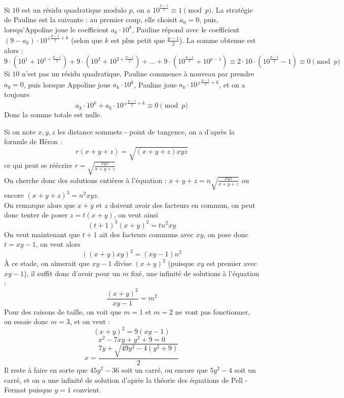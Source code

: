 \begin{sol}
Si $10$ est un résidu quadratique modulo $p$, on a $10^{\frac{p - 1}2}\equiv 1 \pmod p$. La stratégie de Pauline est la suivante : au premier coup, elle choisit $a_0 = 0$, puis, lorsqu'Appoline joue le coefficient $a_k\cdot 10^k$, Pauline répond avec le coefficient $(9 - a_k)\cdot 10^{\pm \frac{p - 1}2 + k}$ (selon que $k$ est plus petit que $\frac{p - 1}2$). La somme obtenue est alors :
$$9\cdot (10^1 + 10^{1 + \frac{p - 1}2}) + 9\cdot (10^2 + 10^{2 + \frac{p - 1}2}) + \dots  + 9\cdot (10^{\frac{p - 1}2} + 10^{p - 1})\equiv 2\cdot 10\cdot (10^{\frac{p - 1}2} - 1)\equiv 0\pmod p$$
Si $10$ n'est pas un résidu quadratique, Pauline commence à nouveau par prendre $a_0 = 0$, puis lorsque Appoline joue $a_k\cdot 10^k$, Pauline joue $a_k\cdot 10^{\pm \frac{p - 1}2 + k}$, et on a toujours 
$$a_k\cdot 10^k + a_k\cdot 10^{\pm \frac{p - 1}2 + k}\equiv 0 \pmod p$$
Donc la somme totale est nulle.
\end{sol}


\begin{sol}
Si on note $x, y, z$ les distance sommets - point de tangence, on a d'après la formule de Héron :
$$r(x + y + z) = \sqrt{(x + y + z)xyz}$$
ce qui peut se réécrire $r = \sqrt{\frac{xyz}{x + y + z}}$\\
On cherche donc des solutions entières à l'équation : $x + y + z = n\sqrt{\frac{xyz}{x + y + z}}$ ou encore $(x + y + z)^3 = n^2 xyz$. \\
On remarque alors que $x + y$ et $z$ doivent avoir des facteurs en commun, on peut donc tenter de poser $z = t(x + y)$, on veut ainsi
$$(t + 1)^3(x + y)^2 = tn^2xy$$
On veut maintenant que $t + 1$ ait des facteurs communs avec $xy$, on pose donc $t = xy - 1$, on veut alors $$((x + y)xy)^2 = (xy - 1)n^2$$
À ce stade, on aimerait que $xy - 1$ divise $(x + y)^2$ (puisque $xy$ est premier avec $xy - 1$), il suffit donc d'avoir pour un $m$ fixé, une infinité de solutions à l'équation :
$$\frac{(x + y)^2}{xy - 1} = m^2$$
Pour des raisons de taille, on voit que $m = 1$ et $m = 2$ ne vont pas fonctionner, on essaie donc $m = 3$, et on veut :
 $$(x + y)^2 = 9(xy - 1)$$
$$x^2 - 7xy + y^2 + 9 = 0$$
$$x = \frac{7y + \sqrt{49y^2 - 4(y^2 + 9)}}2$$
Il reste à faire en sorte que $45y^2 - 36$ soit un carré, ou encore que $5y^2 - 4$ soit un carré, et on a une infinité de solution d'après la théorie des équations de Pell - Fermat puisque $y = 1$ convient.
\end{sol}


